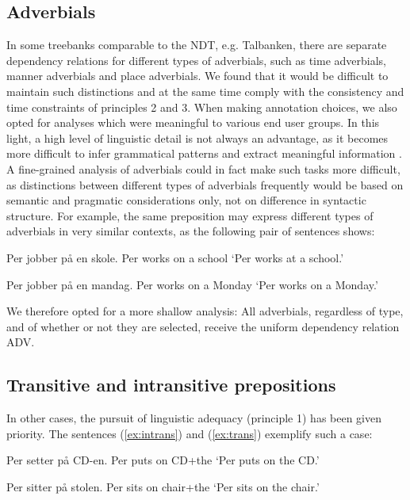 \documentclass[10pt,a4paper]{article}
\begin{document}
\subsection{Adverbials}
In some treebanks comparable to the NDT, e.g. Talbanken, there are
separate dependency relations for different types of adverbials, such
as time adverbials, manner adverbials and place adverbials.  We found
that it would be difficult to maintain such distinctions and at the
same time comply with the consistency and time constraints of
principles 2 and 3.  When making annotation choices, we also opted for
analyses which were meaningful to various end user groups.  In this
light, a high level of linguistic detail is not always an advantage,
as it becomes more difficult to infer grammatical patterns and extract
meaningful information \cite{Mar:Man:08}.  A fine-grained analysis of
adverbials could in fact make such tasks more difficult, as
distinctions between different types of adverbials frequently would be
based on semantic and pragmatic considerations only, not on difference
in syntactic structure.  For example, the same preposition may express
different types of adverbials in very similar contexts, as the
following pair of sentences shows:

\begin{examples}
\item\label{ex:locadv}
\gll Per jobber på en skole.
Per works on a school
\glt `Per works at a school.'
\glend

\item\label{ex:timeadv}
\gll Per jobber på en mandag.
Per works on a Monday
\glt `Per works on a Monday.'
\glend
\end{examples}

We therefore opted for a more shallow analysis:
All adverbials, regardless of type,
and of whether or not they are selected,
receive the uniform dependency relation ADV. 

\subsection{Transitive and intransitive prepositions}\label{prep}
In other cases, the pursuit of linguistic adequacy (principle 1) has been given priority. The sentences (\ref{ex:intrans}) and (\ref{ex:trans}) exemplify such a case:

\begin{examples}
\item\label{ex:intrans}
\gll Per setter på CD-en.
Per puts on CD+the
\glt `Per puts on the CD.'
\glend

\item\label{ex:trans}
\gll Per sitter på stolen.
Per sits on chair+the
\glt `Per sits on the chair.'
\glend
\end{examples}
\end{document}
